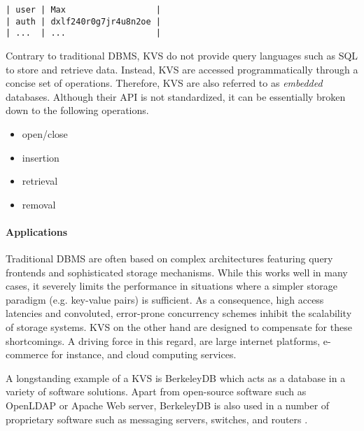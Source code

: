 \begin{lstlisting}
| user | Max                  |
| auth | dxlf240r0g7jr4u8n2oe |
| ...  | ...                  |
\end{lstlisting}

Contrary to traditional DBMS, KVS do not provide query languages such as SQL to
store and retrieve data. Instead, KVS are accessed programmatically through a
concise set of operations. Therefore, KVS are also referred to as
\emph{embedded} databases. Although their API is not standardized, it can be
essentially broken down to the following operations.

\begin{itemize}
    \item open/close
    \item insertion
    \item retrieval
    \item removal
\end{itemize}

\paragraph{Applications}

Traditional DBMS are often based on complex architectures featuring query
frontends and sophisticated storage mechanisms. While this works well in many
cases, it severely limits the performance in situations where a simpler storage
paradigm (e.g. key-value pairs) is sufficient. As a consequence, high access
latencies and convoluted, error-prone concurrency schemes inhibit the
scalability of storage systems. KVS on the other hand are designed to compensate
for these shortcomings. A driving force in this regard, are large internet
platforms, e-commerce for instance, and cloud computing services.

A longstanding example of a KVS is BerkeleyDB which acts as a database in a
variety of software solutions. Apart from open-source software such as OpenLDAP
or Apache Web server, BerkeleyDB is also used in a number of proprietary
software such as messaging servers, switches, and routers
\cite{kaestner2007aspect, olson1999berkeley}.

